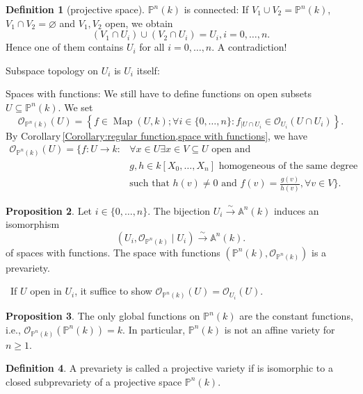 \documentclass[12pt,a4paper]{book}
\newenvironment{prooff}{{\noindent\it\textcolor{cyan!40!black}{Proof}:}\,}{\par}
\theoremstyle{definition}
\newtheorem{defn}{Definition}[section]
\newtheorem{prop}[defn]{Proposition}
\begin{document}
\begin{defn}[projective space]
$\mathbb{P}^n(k)$ is connected: If $V_1\cup V_2=\mathbb{P}^n(k)$, $V_1\cap V_2=\varnothing$ and $V_1,V_2$ open, we obtain 
\begin{equation*}
    (V_1\cap U_i)\cup (V_2\cap U_i)=U_i, i=0,\dots,n.
\end{equation*} 
Hence one of them contains $U_i$ for all $i=0,\dots,n$. A contradiction!

Subspace topology on $U_i$ is $U_i$ itself: 

Spaces with functions: We still have to define functions on open subsets $U \subseteq \mathbb{P}^n(k)$. We set
$$
\mathscr{O}_{\mathbb{P}^n(k)}(U)=\left\{f \in \operatorname{Map}(U, k) ; \forall i \in\{0, \ldots, n\}: f_{\mid U \cap U_i} \in \mathscr{O}_{U_i}\left(U \cap U_i\right)\right\} .
$$
By Corollary\,\ref{Corollary:regular function,space with functions}, we have 
\begin{align*}
     \mathscr{O}_{\mathbb{P}^n(k)}(U)=\{f: U \rightarrow k : &\forall x \in U \exists x \in V \subseteq U \text { open and } \\ 
     &g, h \in k\left[X_0, \ldots, X_n\right] \text{ homogeneous of the same degree}  \\
     &\text{such that } h(v) \neq 0 \text{ and } f(v)=\frac{g(v)}{h(v)}, \forall v \in V \}.
\end{align*}

\end{defn}
\begin{prop}
    Let $i \in\{0, \ldots, n\}$. The bijection $U_i \xrightarrow{\sim} \mathbb{A}^n(k)$ induces an isomorphism
    $$
    \left(U_i, \mathscr{O}_{\mathbb{P}^n(k)} \mid U_i\right) \xrightarrow{\sim} \mathbb{A}^n(k) .
    $$
    of spaces with functions. The space with functions $\left(\mathbb{P}^n(k), \mathscr{O}_{\mathbb{P}^n(k)}\right)$ is a prevariety.
\end{prop}
\begin{prooff}
    If $U$ open in $U_i$, it suffice to show $\mathscr{O}_{\mathbb{P}^n(k)}(U)=\mathscr{O}_{U_i}(U)$.
\end{prooff}
\begin{prop}
    The only global functions on $\mathbb{P}^n(k)$ 
    are the constant functions, i.e., $\mathscr{O}_{\mathbb{P}^n(k)}\left(\mathbb{P}^n(k)\right)=k$. In particular, $\mathbb{P}^n(k)$ is not an affine variety for $n \geq 1$.
\end{prop}
\begin{defn}
    A prevariety is called a projective variety if is isomorphic to a closed 
    subprevariety of a projective space $\mathbb{P}^n(k)$.
\end{defn}
\end{document}
